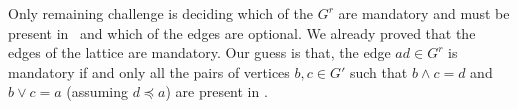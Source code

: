 Only remaining challenge is deciding which of the \(G^r\) are mandatory 
and must be present in \mG\ and which of the edges are optional.
We already proved that the edges of the lattice are mandatory.
Our guess is that, the edge \(ad \in G^r\) is mandatory if and only
all the pairs of vertices \(b,c \in G'\) such that \(b\wedge c = d\)
and \(b \vee c = a\) (assuming \(d \preceq a\)) are present in \mG\@.